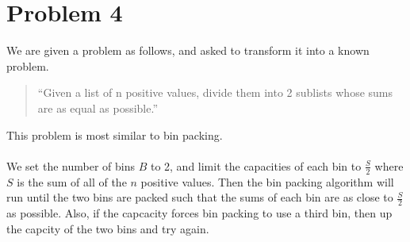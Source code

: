 \section*{Problem 4}

We are given a problem as follows, and asked to transform it into a known problem.
\begin{quote}
``Given a list of n positive values, divide them into 2 sublists whose sums are as equal as possible.''
\end{quote}
This problem is most similar to bin packing. 
\\
\\
We set the number of bins $B$ to 2, and limit the capacities of each bin to 
$\frac{S}{2}$ where $S$ is the sum of all of the $n$ positive values. Then the
bin packing algorithm will run until the two bins are packed such that the
sums of each bin are as close to $\frac{S}{2}$ as possible. Also, if the 
capcacity forces bin packing to use a third bin, then up the capcity of the 
two bins and try again.

